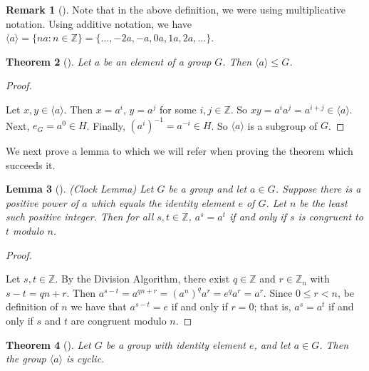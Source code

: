 \documentclass[10pt,]{book}
\theoremstyle{plain}
\newtheorem{theorem}{Theorem}[section]
\newtheorem{lemma}[theorem]{Lemma}
\theoremstyle{definition}
\theoremstyle{definition}
\newtheorem{remark}[theorem]{Remark}
\theoremstyle{definition}
\theoremstyle{definition}
\numberwithin{equation}{section}
\def\Z{\mathbb{Z}}
\newcommand{\lt}{<}
\begin{document}
\begin{remark}[]\label{remark-19}
Note that in the above definition, we were using multiplicative notation. Using additive notation, we have \(\langle a\rangle =\{na:n\in \Z\}=\{\ldots, -2a, -a, 0a, 1a, 2a, \ldots\}.\)%
\end{remark}
\begin{theorem}[{}]\label{theorem-22}
Let \(a\) be an element of a group \(G\). Then \(\langle a\rangle \leq G\).%
\end{theorem}
\begin{proof}\hypertarget{proof-21}{}
Let \(x,y\in \langle a\rangle\). Then \(x=a^i\), \(y=a^j\) for some \(i,j\in \Z\). So \(xy=a^ia^j=a^{i+j}\in \langle a\rangle\). Next, \(e_G=a^0\in H\). Finally, \((a^i)^{-1}=a^{-i}\in H\). So \(\langle a\rangle\) is a subgroup of \(G\).%
\end{proof}
We next prove a lemma to which we will refer when proving the theorem which succeeds it.%
\begin{lemma}[{}]\label{lemma-2}
(Clock Lemma) Let \(G\) be a group and let \(a \in G\). Suppose there is a positive power of \(a\) which equals the identity element \(e\) of \(G\). Let \(n\) be the least such positive integer. Then for all \(s,t\in \Z\), \(a^s=a^t\) if and only if \(s\) is congruent to \(t\) modulo \(n\).%
\end{lemma}
\begin{proof}\hypertarget{proof-22}{}
Let \(s,t\in \Z\). By the Division Algorithm, there exist \(q\in \Z\) and \(r\in \Z_n\) with \(s-t=qn+r\). Then \(a^{s-t}=a^{qn+r}=(a^n)^qa^r=e^qa^r=a^r\). Since \(0\leq r\lt n\), be definition of \(n\) we have that \(a^{s-t}=e\) if and only if \(r=0\); that is, \(a^s=a^t\) if and only if \(s\) and \(t\) are congruent modulo \(n\).%
\end{proof}
\begin{theorem}[{}]\label{theorem-23}
Let \(G\) be a group with identity element \(e\), and let \(a\in G\). Then the group \(\langle a\rangle\) is cyclic.%
\end{theorem}
\end{document}
